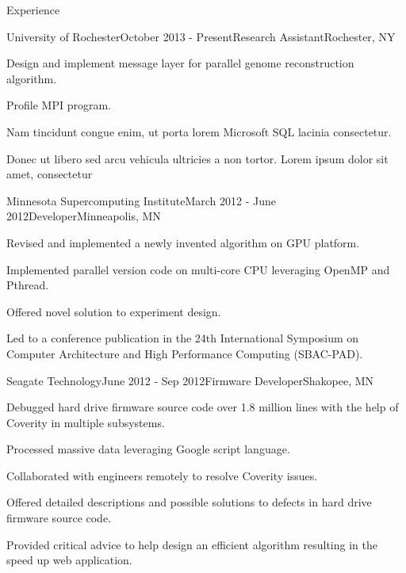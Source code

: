 \documentclass{resume} %
\begin{document}
\begin{rSection}{Experience}

\begin{rSubsection}{University of Rochester}{October 2013 - Present}{Research Assistant}{Rochester, NY}
\item Design and implement message layer for parallel genome reconstruction algorithm.
\item Profile MPI program.
\item Nam tincidunt congue enim, ut porta lorem Microsoft SQL lacinia consectetur.
\item Donec ut libero sed arcu vehicula ultricies a non tortor. Lorem ipsum dolor sit amet, consectetur 
\end{rSubsection}


\begin{rSubsection}{Minnesota Supercomputing Institute}{March 2012 - June 2012}{Developer}{Minneapolis, MN}
\item Revised and implemented a newly invented algorithm on GPU platform.
\item Implemented parallel version code on multi-core CPU leveraging OpenMP and Pthread.
\item Offered novel solution to experiment design.
\item Led to a conference publication in the 24th International Symposium on Computer Architecture and High Performance Computing (SBAC-PAD).
\end{rSubsection}


\begin{rSubsection}{Seagate Technology}{June 2012 - Sep 2012}{Firmware Developer}{Shakopee, MN}
\item Debugged hard drive firmware source code over 1.8 million lines with the help of Coverity in multiple subsystems.
\item Processed massive data leveraging Google script language.
\item Collaborated with engineers remotely to resolve Coverity issues.
\item Offered detailed descriptions and possible solutions to defects in hard drive firmware source code.
\item Provided critical advice to help design an efficient algorithm resulting in the speed up web application.
\end{rSubsection}

\end{rSection}
\end{document}
